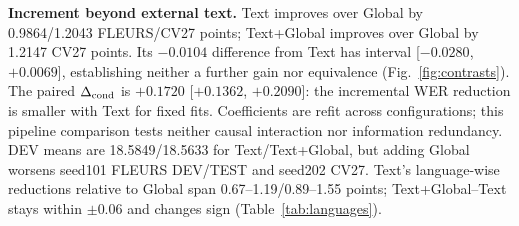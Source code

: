 \noindent\textbf{Increment beyond external text.} Text improves over Global by 0.9864/1.2043 FLEURS/CV27 points; Text+Global improves over Global by 1.2147 CV27 points. Its $-0.0104$ difference from Text has interval [$-0.0280$, $+0.0069$], establishing neither a further gain nor equivalence (Fig.~\ref{fig:contrasts}). The paired $\Delta_{\rm cond}$ is $+0.1720$ [$+0.1362$, $+0.2090$]: the incremental WER reduction is smaller with Text for fixed fits. Coefficients are refit across configurations; this pipeline comparison tests neither causal interaction nor information redundancy. DEV means are 18.5849/18.5633 for Text/Text+Global, but adding Global worsens seed101 FLEURS DEV/TEST and seed202 CV27. Text's language-wise reductions relative to Global span 0.67--1.19/0.89--1.55 points; Text+Global--Text stays within $\pm0.06$ and changes sign (Table~\ref{tab:languages}).
